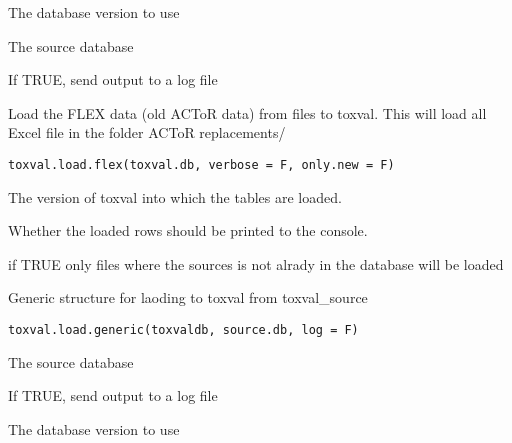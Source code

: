 \documentclass[letterpaper]{book}
\begin{document}
%
\begin{Arguments}
\begin{ldescription}
\item[\code{toxval.db}] The database version to use

\item[\code{source.db}] The source database

\item[\code{log}] If TRUE, send output to a log file
\end{ldescription}
\end{Arguments}
%
\begin{Description}\relax
Load the FLEX data (old ACToR data) from files to toxval. This will load all
Excel file in the folder ACToR replacements/
\end{Description}
%
\begin{Usage}
\begin{verbatim}
toxval.load.flex(toxval.db, verbose = F, only.new = F)
\end{verbatim}
\end{Usage}
%
\begin{Arguments}
\begin{ldescription}
\item[\code{toxval.db}] The version of toxval into which the tables are loaded.

\item[\code{verbose}] Whether the loaded rows should be printed to the console.

\item[\code{only.new}] if TRUE only files where the sources is not alrady in the database
will be loaded
\end{ldescription}
\end{Arguments}
%
\begin{Description}\relax
Generic structure for laoding to toxval from toxval\_source
\end{Description}
%
\begin{Usage}
\begin{verbatim}
toxval.load.generic(toxvaldb, source.db, log = F)
\end{verbatim}
\end{Usage}
%
\begin{Arguments}
\begin{ldescription}
\item[\code{source.db}] The source database

\item[\code{log}] If TRUE, send output to a log file

\item[\code{toxval.db}] The database version to use
\end{ldescription}
\end{Arguments}
\end{document}
